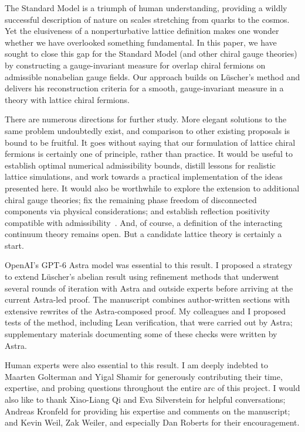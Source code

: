 \documentclass[11pt,a4paper]{article}
\theoremstyle{remark}
\begin{document}
The Standard Model is a triumph of human understanding, providing a wildly successful description of nature on scales stretching from quarks to the cosmos. Yet the elusiveness of a nonperturbative lattice definition makes one wonder whether we have overlooked something fundamental. In this paper, we have sought to close this gap for the Standard Model (and other chiral gauge theories) by constructing a gauge-invariant measure for overlap chiral fermions on admissible nonabelian gauge fields. Our approach builds on L\"uscher's method and delivers his reconstruction criteria for a smooth, gauge-invariant measure in a theory with lattice chiral fermions.

There are numerous directions for further study. More elegant solutions to the same problem undoubtedly exist, and comparison to other existing proposals is bound to be fruitful. It goes without saying that our formulation of lattice chiral fermions is certainly one of principle, rather than practice. It would be useful to establish optimal numerical admissibility bounds, distill lessons for realistic lattice simulations, and work towards a practical implementation of the ideas presented here.  It would also be worthwhile to explore the extension to additional chiral gauge theories; fix the remaining phase freedom of disconnected components via physical considerations; and establish reflection positivity compatible with admissibility~\cite{CreutzPositivity,BietenholzTopology}. And, of course, a definition of the interacting continuum theory remains open. But a candidate lattice theory is certainly a start.


\FloatBarrier
\acknowledgments
OpenAI's GPT-6 Astra model was essential to this result. I proposed a strategy to extend L\"{u}scher's abelian result using refinement methods that underwent several rounds of iteration with Astra and outside experts before arriving at the current Astra-led proof.  The manuscript combines author-written sections with extensive rewrites of the Astra-composed proof. My colleagues and I proposed tests of the method, including Lean verification, that were carried out by Astra; supplementary materials documenting some of these checks were written by Astra.

Human experts were also essential to this result. I am deeply indebted to Maarten Golterman and Yigal Shamir for generously contributing their time, expertise, and probing questions throughout the entire arc of this project. I would also like to thank Xiao-Liang Qi and Eva Silverstein for helpful conversations; Andreas Kronfeld for providing his expertise and comments on the manuscript; and Kevin Weil, Zak Weiler, and especially Dan Roberts for their encouragement. 
\end{document}
